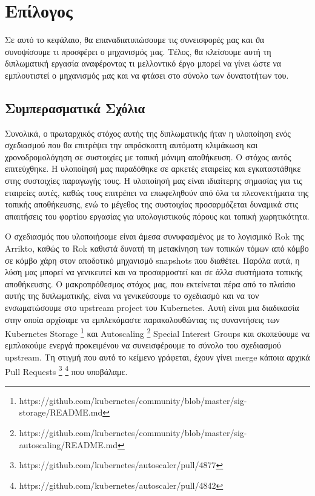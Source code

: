 \chapter{Επίλογος} \label{chapter:gr-conclusion}

Σε αυτό το κεφάλαιο, θα επαναδιατυπώσουμε τις συνεισφορές µας και ϑα συνοψίσουμε
τι προσφέρει ο μηχανισμός µας. Τέλος, θα κλείσουμε αυτή τη διπλωματική εργασία
αναφέροντας τι μελλοντικό έργο μπορεί να γίνει ώστε να εμπλουτιστεί ο μηχανισμός
µας και να φτάσει στο σύνολο των δυνατοτήτων του.

\section{Συμπερασματικά Σχόλια}
\label{section:gr-conclusion_concluding_remarks}


Συνολικά, ο πρωταρχικός στόχος αυτής της διπλωματικής ήταν η υλοποίηση ενός
σχεδιασμού που θα επιτρέψει την απρόσκοπτη αυτόματη κλιμάκωση και
χρονοδρομολόγηση σε συστοιχίες με τοπική μόνιμη αποθήκευση. Ο στόχος αυτός
επιτεύχθηκε. Η υλοποίησή μας παραδόθηκε σε αρκετές εταιρείες και εγκαταστάθηκε
στης συστοιχίες παραγωγής τους. Η υλοποίησή μας είναι ιδιαίτερης σημασίας για
τις εταιρείες αυτές, καθώς τους επιτρέπει να επωφεληθούν από όλα τα
πλεονεκτήματα της τοπικής αποθήκευσης, ενώ το μέγεθος της συστοιχίας
προσαρμόζεται δυναμικά στις απαιτήσεις του φορτίου εργασίας για υπολογιστικούς
πόρους και τοπική χωρητικότητα.

Ο σχεδιασμός που υλοποιήσαμε είναι άμεσα συνυφασμένος με το λογισμικό Rok της
Arrikto, καθώς το Rok καθιστά δυνατή τη μετακίνηση των τοπικών τόμων από κόμβο
σε κόμβο χάρη στον αποδοτικό μηχανισμό snapshots που διαθέτει. Παρόλα αυτά, η
λύση μας μπορεί να γενικευτεί και να προσαρμοστεί και σε άλλα συστήματα τοπικής
αποθήκευσης. Ο μακροπρόθεσμος στόχος μας, που εκτείνεται πέρα από το πλαίσιο
αυτής της διπλωματικής, είναι να γενικεύσουμε το σχεδιασμό και να τον
ενσωματώσουμε στο upstream project του Kubernetes. Αυτή είναι μια διαδικασία
στην οποία αρχίσαμε να εμπλεκόμαστε παρακολουθώντας τις συναντήσεις των
Kubernetes Storage
\footnote{https://github.com/kubernetes/community/blob/master/sig-storage/README.md}
και Autoscaling
\footnote{https://github.com/kubernetes/community/blob/master/sig-autoscaling/README.md}
Special Interest Groups και σκοπεύουμε να εμπλακούμε ενεργά προκειμένου να
συνεισφέρουμε το σύνολο του σχεδιασμού upstream. Τη στιγμή που αυτό το κείμενο
γράφεται, έχουν γίνει merge κάποια αρχικά Pull Requests
\footnote{https://github.com/kubernetes/autoscaler/pull/4877}
\footnote{https://github.com/kubernetes/autoscaler/pull/4842} που υποβάλαμε.


